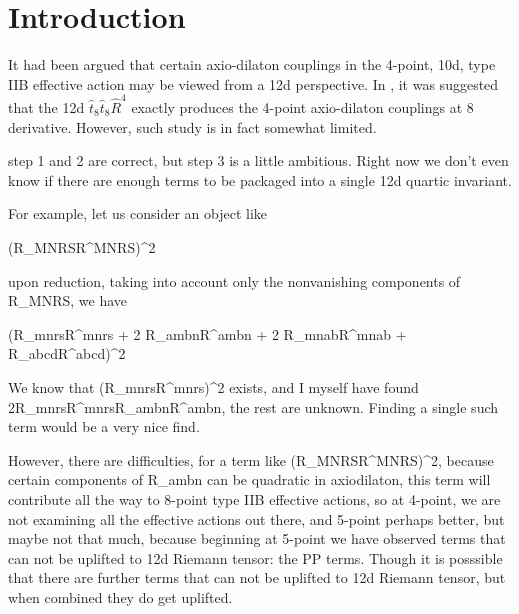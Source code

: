 \section{Introduction}
It had been argued that certain axio-dilaton couplings in the 4-point, 10d, type IIB effective action may be viewed from a 12d perspective.
In \cite{Minasian:2015bxa}, it was suggested that the 12d $\hat{t}_8 \hat{t}_8 \hat{R}^4$ exactly produces the 4-point axio-dilaton couplings at 8 derivative.
However, such study is in fact somewhat limited.



step 1 and 2 are correct, but step 3 is a little ambitious. Right now we don't even know if there are enough terms to be packaged into a single 12d quartic invariant.

For example, let us consider an object like

(R_{MNRS}R^{MNRS})^2

upon reduction, taking into account only the nonvanishing components of R_{MNRS}, we have

(R_{mnrs}R^{mnrs} + 2 R_{ambn}R^{ambn} + 2 R_{mnab}R^{mnab} + R_{abcd}R^{abcd})^2


We know that (R_{mnrs}R^{mnrs})^2 exists, and I myself have found 2R_{mnrs}R^{mnrs}R_{ambn}R^{ambn}, the rest are unknown. Finding a single such term would be a very nice find.

However, there are difficulties, for a term like (R_{MNRS}R^{MNRS})^2, because certain components of R_{ambn} can be quadratic in axiodilaton, this term will contribute all the way to 8-point type IIB effective actions, so at 4-point, we are not examining all the effective actions out there, and 5-point perhaps better, but maybe not that much, because beginning at 5-point we have observed terms that can not be uplifted to 12d Riemann tensor: the PP terms. Though it is posssible that there are further terms that can not be uplifted to 12d Riemann tensor, but when combined they do get uplifted.
